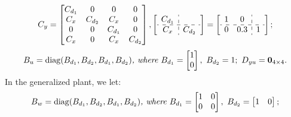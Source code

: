 \begin{equation*}
C_y = 
\begin{bmatrix}
C_{d_1} & 0 & 0 & 0\\
C_{x} & C_{d_2} & C_{x} & 0\\
0 & 0 & C_{d_1} & 0\\
C_{x} & 0 & C_{x} & C_{d_2}
\end{bmatrix},
\left[
\begin{array}{c:c}
    C_{d_1} & \empty \\
    \hdashline
    C_x & C_{d_2}\\
\end{array}\right]
= 
\left[
\begin{array}{cc:c}
    1 & 0 & \empty \\
    \hdashline
    0 & 0.3 & 1\\
\end{array}\right];
\end{equation*}
\begin{equation*}
B_u = {\mathrm{diag}}(B_{d_1}, B_{d_2}, B_{d_1}, B_{d_2})
\textit{, where }
B_{d_1} = \begin{bmatrix}
1\\
0
\end{bmatrix},\ B_{d_2} = 1;\ D_{yu} = \mathbf{0}_{4\times 4}.
\end{equation*}
In the generalized plant, we let:
\begin{equation*}
B_w = {\mathrm{diag}}(B_{d_1}, B_{d_2}, B_{d_1}, B_{d_2})
\textit{, where }
B_{d_1} = \begin{bmatrix}
1 & 0\\
0 & 0
\end{bmatrix},\ B_{d_2} = \begin{bmatrix}
1 & 0\\
\end{bmatrix};
\end{equation*}
